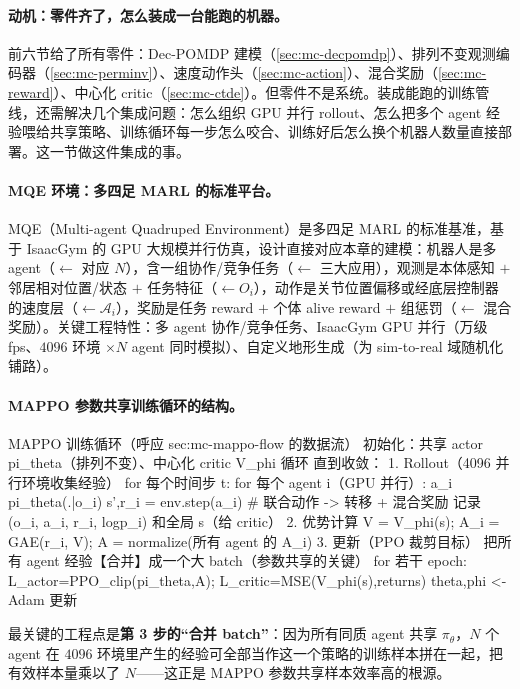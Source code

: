 \paragraph{动机：零件齐了，怎么装成一台能跑的机器。}
前六节给了所有零件：Dec-POMDP 建模（\cref{sec:mc-decpomdp}）、排列不变观测编码器（\cref{sec:mc-perminv}）、速度动作头（\cref{sec:mc-action}）、混合奖励（\cref{sec:mc-reward}）、中心化 critic（\cref{sec:mc-ctde}）。但零件不是系统。装成能跑的训练管线，还需解决几个集成问题：怎么组织 GPU 并行 rollout、怎么把多个 agent 经验喂给共享策略、训练循环每一步怎么咬合、训练好后怎么换个机器人数量直接部署。这一节做这件集成的事。

\paragraph{MQE 环境：多四足 MARL 的标准平台。}
MQE（Multi-agent Quadruped Environment）是多四足 MARL 的标准基准，基于 IsaacGym 的 GPU 大规模并行仿真\cite{xiong2024mqe}，设计直接对应本章的建模：机器人是多 agent（$\leftarrow$ 对应 $N$），含一组协作/竞争任务（$\leftarrow$ 三大应用），观测是本体感知 $+$ 邻居相对位置/状态 $+$ 任务特征（$\leftarrow O_i$），动作是关节位置偏移或经底层控制器的速度层（$\leftarrow\mathcal{A}_i$），奖励是任务 reward $+$ 个体 alive reward $+$ 组惩罚（$\leftarrow$ 混合奖励）。关键工程特性：多 agent 协作/竞争任务、IsaacGym GPU 并行（万级 fps、$4096$ 环境 $\times N$ agent 同时模拟）、自定义地形生成（为 sim-to-real 域随机化铺路）。

\paragraph{MAPPO 参数共享训练循环的结构。}
\begin{codebox}[text]{MAPPO 训练循环（呼应 sec:mc-mappo-flow 的数据流）}
初始化：共享 actor pi_theta（排列不变）、中心化 critic V_phi
循环 直到收敛：
  1. Rollout（4096 并行环境收集经验）
       for 每个时间步 t:  for 每个 agent i（GPU 并行）:  a_i ~ pi_theta(.|o_i)
       s',{r_i} = env.step({a_i})            # 联合动作 -> 转移 + 混合奖励
       记录 (o_i, a_i, r_i, logp_i) 和全局 s（给 critic）
  2. 优势计算
       V = V_phi(s);  A_i = GAE(r_i, V);  A = normalize(所有 agent 的 A_i)
  3. 更新（PPO 裁剪目标）
       把所有 agent 经验【合并】成一个大 batch（参数共享的关键）
       for 若干 epoch:  L_actor=PPO_clip(pi_theta,A);  L_critic=MSE(V_phi(s),returns)
                        theta,phi <- Adam 更新
\end{codebox}
\noindent 最关键的工程点是\textbf{第 3 步的“合并 batch”}：因为所有同质 agent 共享 $\pi_\theta$，$N$ 个 agent 在 $4096$ 环境里产生的经验可全部当作这一个策略的训练样本拼在一起，把有效样本量乘以了 $N$——这正是 MAPPO 参数共享样本效率高的根源。

